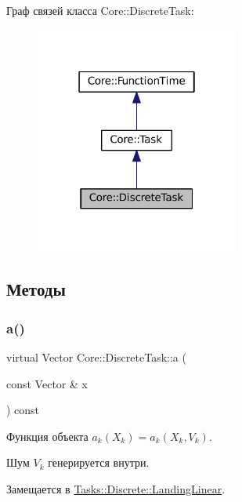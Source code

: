 Граф связей класса Core\+:\+:Discrete\+Task\+:\nopagebreak
\begin{figure}[H]
\begin{center}
\leavevmode
\includegraphics[width=190pt]{class_core_1_1_discrete_task__coll__graph}
\end{center}
\end{figure}


\subsection{Методы}
\hypertarget{class_core_1_1_discrete_task_a49d377fa365d5ec3e05962ee751f2d9e}{}\label{class_core_1_1_discrete_task_a49d377fa365d5ec3e05962ee751f2d9e} 
\subsubsection{\texorpdfstring{a()}{a()}}
{\footnotesize\ttfamily virtual Vector Core\+::\+Discrete\+Task\+::a (\begin{DoxyParamCaption}\item[{const Vector \&}]{x }\end{DoxyParamCaption}) const\hspace{0.3cm}{\ttfamily [pure virtual]}}



Функция объекта $a_k(X_k) = a_k(X_k, V_k)$. 

Шум $V_k$ генерируется внутри. 

Замещается в \hyperlink{class_tasks_1_1_discrete_1_1_landing_linear_af0c0c48603fc226055ee233f93fa21fc}{Tasks\+::\+Discrete\+::\+Landing\+Linear}.

\hypertarget{class_core_1_1_discrete_task_a82c1aa8100dd9211739f8fd9f7d52c81}{}\label{class_core_1_1_discrete_task_a82c1aa8100dd9211739f8fd9f7d52c81} 
